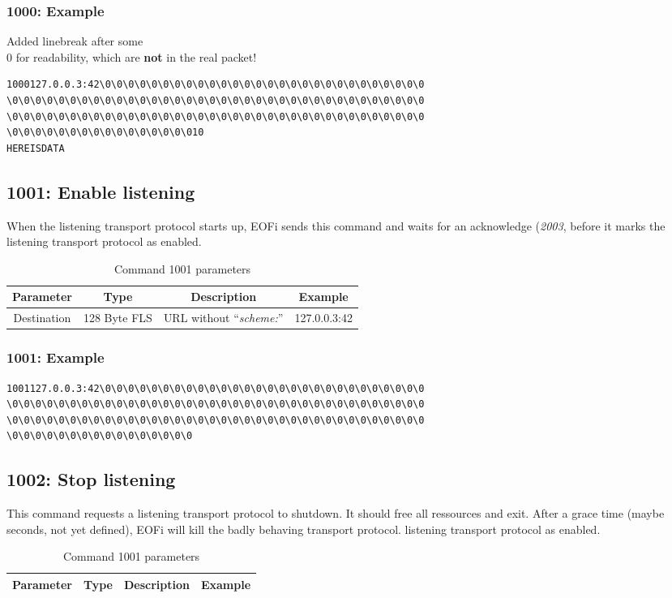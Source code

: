 \documentclass[12pt,a4paper]{book}
\begin{document}
\subsubsection{1000: Example}
Added linebreak after some \\0 for readability, which are \textbf{not} in
the real packet!
\begin{verbatim}
1000127.0.0.3:42\0\0\0\0\0\0\0\0\0\0\0\0\0\0\0\0\0\0\0\0\0\0\0\0\0\0\0\0
\0\0\0\0\0\0\0\0\0\0\0\0\0\0\0\0\0\0\0\0\0\0\0\0\0\0\0\0\0\0\0\0\0\0\0\0
\0\0\0\0\0\0\0\0\0\0\0\0\0\0\0\0\0\0\0\0\0\0\0\0\0\0\0\0\0\0\0\0\0\0\0\0
\0\0\0\0\0\0\0\0\0\0\0\0\0\0\0\010
HEREISDATA
\end{verbatim}
\subsection{1001: Enable listening}
%
When the listening transport protocol starts up, EOFi sends this command and
waits for an acknowledge (\emph{2003}, before it marks the
listening transport protocol as enabled.
\begin{longtable}{|c|c|c|c|}
\caption{Command 1001 parameters}\\
\hline
\textbf{Parameter} & \textbf{Type} & \textbf{Description} & \textbf{Example}\\
\hline
Destination & 128 Byte FLS & URL without "`\emph{scheme:}"' & 127.0.0.3:42\\
\hline
\end{longtable}
\subsubsection{1001: Example}
\begin{verbatim}
1001127.0.0.3:42\0\0\0\0\0\0\0\0\0\0\0\0\0\0\0\0\0\0\0\0\0\0\0\0\0\0\0\0
\0\0\0\0\0\0\0\0\0\0\0\0\0\0\0\0\0\0\0\0\0\0\0\0\0\0\0\0\0\0\0\0\0\0\0\0
\0\0\0\0\0\0\0\0\0\0\0\0\0\0\0\0\0\0\0\0\0\0\0\0\0\0\0\0\0\0\0\0\0\0\0\0
\0\0\0\0\0\0\0\0\0\0\0\0\0\0\0\0
\end{verbatim}
\subsection{1002: Stop listening}
%
This command requests a listening transport protocol to 
shutdown. It should free all ressources and exit.
After a grace time (maybe seconds, not yet defined), EOFi will kill the badly
behaving transport protocol.
listening transport protocol as enabled.
\begin{longtable}{|c|c|c|c|}
\caption{Command 1001 parameters}\\
\hline
\textbf{Parameter} & \textbf{Type} & \textbf{Description} & \textbf{Example}\\
\hline
\end{longtable}
\end{document}

